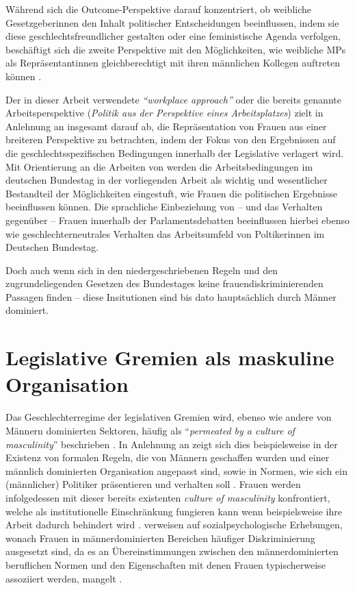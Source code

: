 \documentclass[12pt, 
    twoside=false, 
    bibliography=totoc, 
    numbers=endperiod, 
    headings=normal, 
    toc=chapterentrydotfill
    ]{scrbook}
\begin{document}
Während sich die Outcome-Perspektive darauf konzentriert, ob weibliche Gesetzgeberinnen den Inhalt politischer Entscheidungen beeinflussen, indem sie diese geschlechtsfreundlicher gestalten oder eine feministische Agenda verfolgen, beschäftigt sich die zweite Perspektive mit den Möglichkeiten, wie weibliche MPs als Repräsentantinnen gleichberechtigt mit ihren männlichen Kollegen auftreten können \parencites[199]{erikson_2018}{dahlerup_2006}{dahlerup_1988}.

Der in dieser Arbeit verwendete \emph{\enquote{workplace approach}} oder die bereits genannte Arbeitsperspektive  (\emph{Politik aus der Perspektive eines Arbeitsplatzes}) zielt in Anlehnung an \textcite{erikson_2018} insgesamt darauf ab, die Repräsentation von Frauen aus einer breiteren Perspektive zu betrachten, indem der Fokus von den Ergebnissen auf die geschlechtsspezifischen Bedingungen innerhalb der Legislative verlagert wird. Mit Orientierung an die Arbeiten von \textcites{dahlerup_2006}{dahlerup_1988}{erikson_2018} werden die  Arbeitsbedingungen im deutschen Bundestag in der vorliegenden Arbeit als wichtig und wesentlicher Bestandteil der Möglichkeiten eingestuft, wie Frauen die politischen Ergebnisse beeinflussen können. Die sprachliche Einbeziehung von -- und das Verhalten gegenüber -- Frauen innerhalb der Parlamentsdebatten beeinflussen hierbei ebenso wie geschlechterneutrales Verhalten das Arbeitsumfeld von Poltikerinnen im Deutschen Bundestag.

Doch auch wenn sich in den niedergeschriebenen Regeln und den zugrundeliegenden Gesetzen des Bundestages keine frauendiskriminierenden Passagen finden -- diese Insitutionen sind bis dato hauptsächlich durch Männer dominiert.

\section{Legislative Gremien als maskuline Organisation}


Das Geschlechterregime der legislativen Gremien wird, ebenso wie andere von Männern dominierten Sektoren, häufig als \enquote{\emph{permeated by a culture of masculinity}} beschrieben \parencites[200]{erikson_2018}{lovenduski_2005}.
In Anlehnung an \textcite{acker_1990} zeigt sich dies beispielsweise in der Existenz von formalen Regeln, die von Männern geschaffen wurden und einer männlich dominierten Organisation angepasst sind, sowie in Normen, wie sich ein (männlicher) Politiker präsentieren und verhalten soll \parencites[200]{erikson_2018}[48]{acker_1990}. Frauen werden infolgedessen mit dieser bereits existenten \emph{culture of masculinity} konfrontiert, welche als institutionelle Einschränkung fungieren kann wenn beispielsweise ihre Arbeit dadurch behindert wird \parencites[200]{erikson_2018}[47-56]{lovenduski_2005}. \textcite{erikson_2018} verweisen auf sozialpsychologische Erhebungen, wonach Frauen in männerdominierten Bereichen häufiger Diskriminierung ausgesetzt sind, da es an Übereinstimmungen zwischen den männerdominierten beruflichen Normen und den Eigenschaften mit denen Frauen typischerweise assoziiert werden, mangelt \parencites[vgl.][]{burgess_1999}{eagly_2002}{heilman_2001}{heilman_2004}. 
\\
\end{document}
